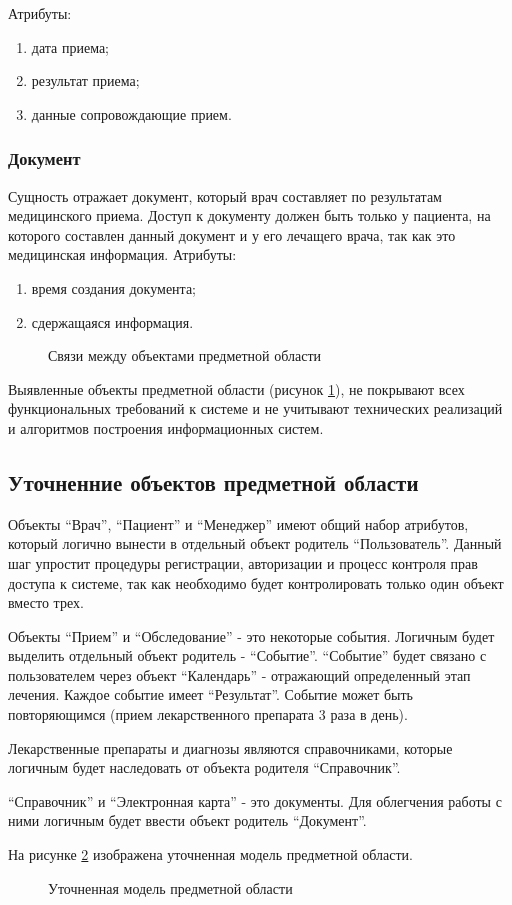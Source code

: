Атрибуты:
\begin{enumerate}
  \item дата приема; 
  \item результат приема; 
  \item данные сопровождающие прием. 
\end{enumerate}

\subsubsection{Документ}
Сущность отражает документ, который врач составляет по результатам медицинского
приема. Доступ к документу должен быть только у пациента, на которого составлен
данный документ и у его лечащего врача, так как это медицинская информация.
Атрибуты:
\begin{enumerate}
  \item время создания документа;
  \item сдержащаяся информация. 
\end{enumerate}

\begin{figure}[h]
\caption{Связи между объектами предметной области}
\label{ris:object_model}
\end{figure}

Выявленные объекты предметной области (рисунок \ref{ris:object_model}), не покрывают всех
функциональных требований к системе и не учитывают технических реализаций и алгоритмов
построения информационных систем.

\subsection{Уточненние объектов предметной области}
Объекты “Врач”, “Пациент” и “Менеджер” имеют общий набор атрибутов, который
логично вынести в отдельный объект родитель “Пользователь”. Данный шаг упростит
процедуры регистрации, авторизации и процесс контроля прав доступа к системе,
так как необходимо будет контролировать только один объект вместо трех.

Объекты “Прием” и “Обследование” - это некоторые события. Логичным будет
выделить отдельный объект родитель - “Событие”. “Событие” будет связано с
пользователем через объект “Календарь” - отражающий определенный этап лечения.
Каждое событие имеет “Результат”. Событие может быть повторяющимся (прием
лекарственного препарата 3 раза в день). 

Лекарственные препараты и диагнозы являются справочниками, которые логичным
будет наследовать от объекта родителя “Справочник”.

“Справочник” и “Электронная карта” - это документы. Для облегчения работы с ними
логичным будет ввести объект родитель “Документ”.

На рисунке \ref{ris:data_logic_model} изображена уточненная модель предметной
области.
 
\begin{figure}[h]
\caption{Уточненная модель предметной области}
\label{ris:data_logic_model}
\end{figure}